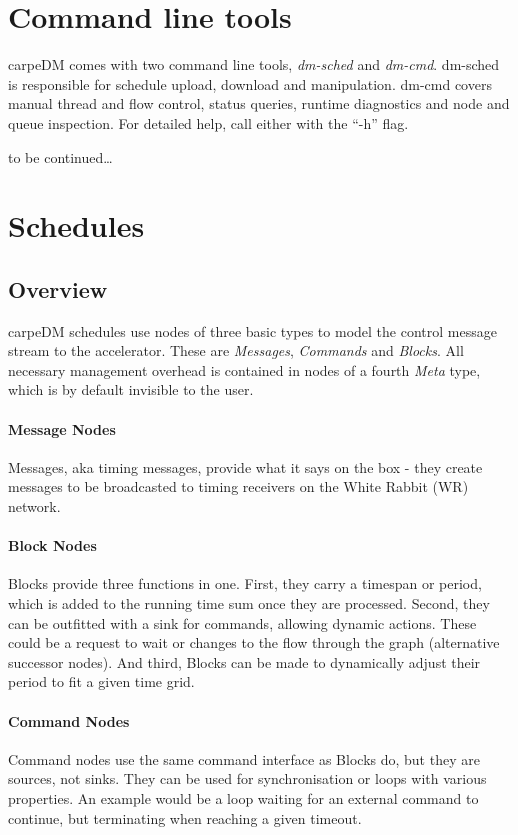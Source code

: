 \section{Command line tools}

carpeDM comes with two command line tools, \emph{dm-sched} and \emph{dm-cmd}. dm-sched is responsible for schedule upload, download and manipulation. dm-cmd covers manual thread and flow control, status queries, runtime diagnostics and node and queue inspection. For detailed help, call either with the \enquote{-h} flag.


to be continued\dots

\section{Schedules}
\label{ssec:bblocks}

\subsection{Overview}

carpeDM schedules use nodes of three basic types to model the control message stream to the accelerator. These are \emph{Messages}, \emph{Commands} and \emph{Blocks}. All necessary management overhead is contained in nodes of a fourth \emph{Meta} type, which is by default invisible to the user.

\paragraph{Message Nodes}
Messages, aka timing messages, provide what it says on the box - they create messages to be broadcasted to timing receivers on the White Rabbit (WR) network.
\paragraph{Block Nodes}
Blocks provide three functions in one. First, they carry a timespan or period, which is added to the running time sum once they are processed. Second, they can be outfitted with a sink for commands, allowing dynamic actions. These could be a request to wait or changes to the flow through the graph (alternative successor nodes). And third, Blocks can be made to dynamically adjust their period to fit a given time grid.
\paragraph{Command Nodes} Command nodes use the same command interface as Blocks do, but they are sources, not sinks. They can be used for synchronisation or loops with various properties. An example would be a loop waiting for an external command to continue, but terminating when reaching a given timeout.

